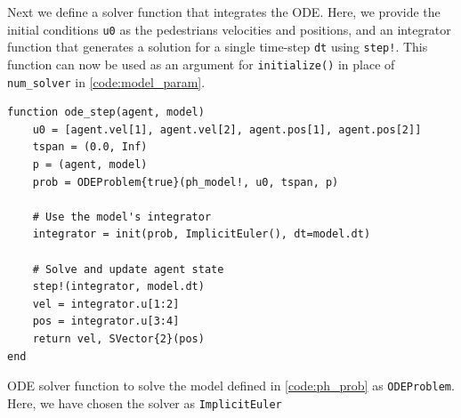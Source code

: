 Next we define a solver function that integrates the ODE. Here, we provide the initial conditions \texttt{u0} as the pedestrians velocities and positions, and an integrator function that generates a solution for a single time-step \texttt{dt} using \texttt{step!}. This function can now be used as an argument for \texttt{initialize()} in place of \texttt{num\_solver} in \autoref{code:model_param}.
\begin{listing}[H]
\begin{verbatim}    
function ode_step(agent, model)
    u0 = [agent.vel[1], agent.vel[2], agent.pos[1], agent.pos[2]]
    tspan = (0.0, Inf)
    p = (agent, model)
    prob = ODEProblem{true}(ph_model!, u0, tspan, p)
    
    # Use the model's integrator
    integrator = init(prob, ImplicitEuler(), dt=model.dt)
    
    # Solve and update agent state
    step!(integrator, model.dt)
    vel = integrator.u[1:2]
    pos = integrator.u[3:4]
    return vel, SVector{2}(pos)
end
\end{verbatim}
\caption{ODE solver function to solve the model defined in \autoref{code:ph_prob} as \texttt{ODEProblem}. Here, we have chosen the solver as \texttt{ImplicitEuler}}
\label{code:ph_solver}
\end{listing}

